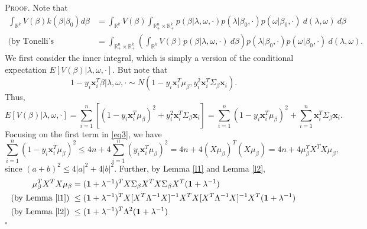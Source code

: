\documentclass[12pt]{article}
\newcounter{ProofCounter}
\newenvironment{Proof}{\stepcounter{ProofCounter}\textsc{Proof.}}{\hfill$\square$}
\begin{document}
\begin{Proof}
  Note that 
  \begin{align}
    \int_{\mathbb{R}^{k}} V(\beta) k(\beta|\beta_0)d\beta & = \int_{\mathbb{R}^{k}}V(\beta) \int_{\mathbb{R}^{n}_+\times \mathbb{R}^{k}_+}
    p(\beta|\lambda,\omega, \cdot)p(\lambda|\beta_0, \cdot)p(\omega|\beta_0, \cdot)\ d(\lambda, \omega)\ d\beta \nonumber \\
    \text{(by Tonelli's Theorem)} \ & = \int_{\mathbb{R}^{n}_+\times\mathbb{R}^{k}_+} \left( \int_{\mathbb{R}^{k}} V(\beta)p(\beta|\lambda, \omega,
    \cdot)\ d\beta \right) p(\lambda|\beta_0,\cdot)p(\omega|\beta_0, \cdot)\ d(\lambda, \omega).
    \label{eq0}
  \end{align}
  We first consider the inner integral, which is simply a version of the conditional expectation $E[V(\beta)|\lambda,\omega,\cdot]$.
  But note that 
  \begin{equation*}
    1 - y_i\bm{x}_i^T\beta | \lambda, \omega, \cdot \sim N\left( 1 - y_i\bm{x}_i^T\mu_{\beta}, y_i^2 \bm{x}_i^T \Sigma_{\beta}\bm{x}_i\right).
    \label{eq2}
  \end{equation*}
  Thus,
  \begin{equation}
    E[V(\beta)|\lambda,\omega,\cdot] = \sum_{i=1}^{n}\left[(1 - y_i\bm{x}_i^T\mu_{\beta})^2 + y_i^2 \bm{x}_i^T \Sigma_{\beta} \bm{x}_i\right] = \sum_{i=1}^{n}
    (1 - y_i\bm{x}_i^T\mu_{\beta})^2 + \sum_{i=1}^{n}\bm{x}_i^T\Sigma_{\beta}\bm{x}_i.
    \label{eq3}
  \end{equation}
  Focusing on the first term in \eqref{eq3}, we have 
  \begin{equation}
    \sum_{i=1}^{n}(1 - y_i \bm{x}_i^T \mu_{\beta})^2 \leq 4n + 4\sum_{i=1}^{n}(y_i\bm{x}_i^T \mu_{\beta})^2 = 4n + 4(X\mu_{\beta})^T (X\mu_{\beta}) 
    = 4n + 4\mu_{\beta}^T X^T X \mu_{\beta},
    \label{eq4}
  \end{equation}
  since $(a + b)^2 \leq 4|a|^2 + 4|b|^2$. Further, by Lemma \ref{l1} and Lemma \ref{l2},
  \begin{align}
    \mu_{\beta}^T X^T X \mu_{\beta} & = (\bm{1} + \lambda^{-1})^T X \Sigma_{\beta}X^T X\Sigma_{\beta} X^T (\bm{1} + \lambda^{-1}) \nonumber \\
    \text{(by Lemma \ref{l1})}\ & \leq (\bm{1} + \lambda^{-1})^T X[X^T\Lambda^{-1}X]^{-1}X^T X[X^T\Lambda^{-1}X]^{-1}X^T (\bm{1} + \lambda^{-1}) \nonumber \\
    \text{(by Lemma \ref{l2})}\ & \leq (\bm{1} + \lambda^{-1})^T \Lambda^{2} (\bm{1} + \lambda^{-1})\nonumber \\

\end{align}
\end{Proof}
\end{document}
